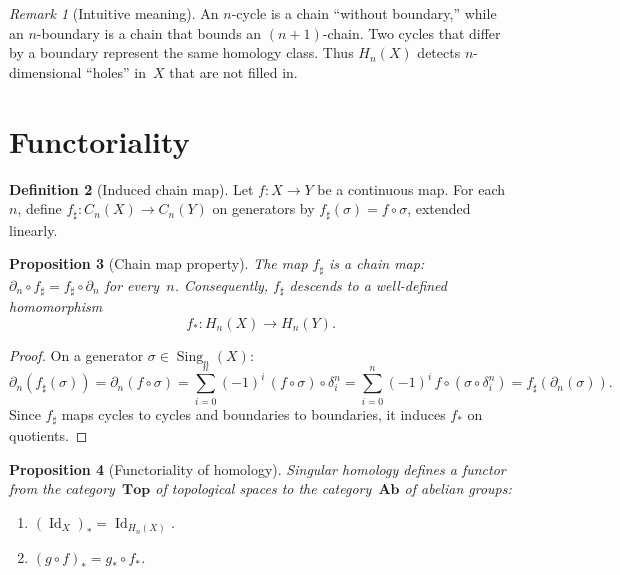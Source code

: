 \documentclass[12pt,a4paper,openany]{book}
\theoremstyle{definition}
\newtheorem{definition}{Definition}[chapter]
\theoremstyle{plain}
\newtheorem{proposition}[definition]{Proposition}
\theoremstyle{remark}
\newtheorem{remark}[definition]{Remark}
\DeclareMathOperator{\Id}{Id}
\begin{document}
\begin{remark}[Intuitive meaning]\label{rem:homology-intuition}
An $n$-cycle is a chain ``without boundary,'' while an $n$-boundary
is a chain that bounds an $(n{+}1)$-chain.  Two cycles that differ by a
boundary represent the same homology class.  Thus $H_n(X)$ detects
$n$-dimensional ``holes'' in~$X$ that are not filled in.
\end{remark}

\section{Functoriality}\label{sec:functoriality}

\begin{definition}[Induced chain map]\label{def:induced-chain-map}
Let $f\colon X\to Y$ be a continuous map.  For each~$n$, define
$f_\sharp\colon C_n(X)\to C_n(Y)$ on generators by
$f_\sharp(\sigma)=f\circ\sigma$, extended linearly.
\end{definition}

\begin{proposition}[Chain map property]\label{prop:chain-map}
The map $f_\sharp$ is a chain map: $\partial_n\circ f_\sharp = f_\sharp\circ\partial_n$
for every~$n$.  Consequently, $f_\sharp$ descends to a well-defined homomorphism
\[
  f_*\colon H_n(X)\longrightarrow H_n(Y).
\]
\end{proposition}

\begin{proof}
On a generator $\sigma\in\operatorname{Sing}_n(X)$:
\[
  \partial_n(f_\sharp(\sigma))
  = \partial_n(f\circ\sigma)
  = \sum_{i=0}^{n}(-1)^i\,(f\circ\sigma)\circ\delta_i^n
  = \sum_{i=0}^{n}(-1)^i\,f\circ(\sigma\circ\delta_i^n)
  = f_\sharp(\partial_n(\sigma)).
\]
Since $f_\sharp$ maps cycles to cycles and boundaries to boundaries,
it induces $f_*$ on quotients.
\end{proof}

\begin{proposition}[Functoriality of homology]\label{prop:functoriality}
Singular homology defines a functor from the category~$\mathbf{Top}$
of topological spaces to the category~$\mathbf{Ab}$ of abelian groups:
\begin{enumerate}[label=\textup{(\roman*)},leftmargin=2.5em]
  \item $(\Id_X)_* = \Id_{H_n(X)}$.
  \item $(g\circ f)_* = g_*\circ f_*$.
\end{enumerate}
\end{proposition}
\end{document}
